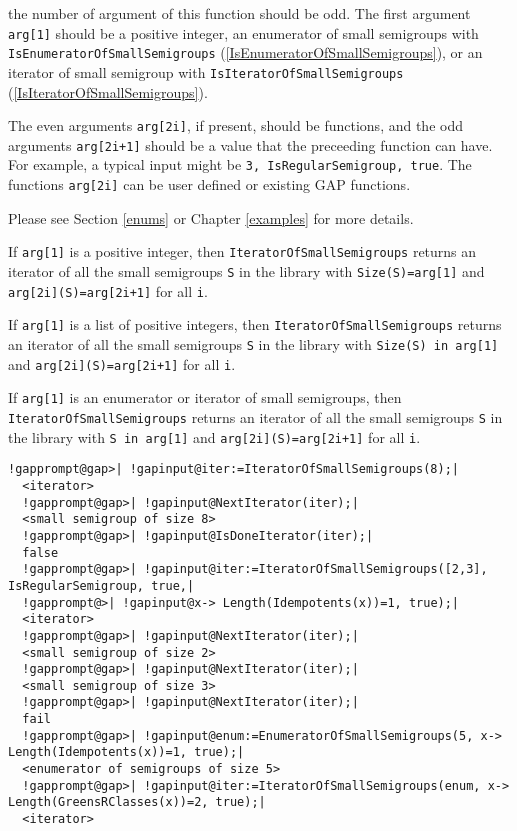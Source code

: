 \documentclass[a4paper,11pt]{report}
\begin{document}
{{{ the number of argument of this function should be odd. The first argument \texttt{arg[1]} should be a positive integer, an enumerator of small semigroups with \texttt{IsEnumeratorOfSmallSemigroups} (\ref{IsEnumeratorOfSmallSemigroups}), or an iterator of small semigroup with \texttt{IsIteratorOfSmallSemigroups} (\ref{IsIteratorOfSmallSemigroups}). 

 The even arguments \texttt{arg[2i]}, if present, should be functions, and the odd arguments \texttt{arg[2i+1]} should be a value that the preceeding function can have. For example, a
typical input might be \texttt{3, IsRegularSemigroup, true}. The functions \texttt{arg[2i]} can be user defined or existing \textsf{GAP} functions.

 Please see Section \ref{enums} or Chapter \ref{examples} for more details. 

 If \texttt{arg[1]} is a positive integer, then \texttt{IteratorOfSmallSemigroups} returns an iterator of all the small semigroups \texttt{S} in the library with \texttt{Size(S)=arg[1]} and \texttt{arg[2i](S)=arg[2i+1]} for all \texttt{i}. 

 If \texttt{arg[1]} is a list of positive integers, then \texttt{IteratorOfSmallSemigroups} returns an iterator of all the small semigroups \texttt{S} in the library with \texttt{Size(S) in arg[1]} and \texttt{arg[2i](S)=arg[2i+1]} for all \texttt{i}. 

 If \texttt{arg[1]} is an enumerator or iterator of small semigroups, then \texttt{IteratorOfSmallSemigroups} returns an iterator of all the small semigroups \texttt{S} in the library with \texttt{S in arg[1]} and \texttt{arg[2i](S)=arg[2i+1]} for all \texttt{i}. 

 
\begin{Verbatim}[commandchars=!@|,fontsize=\small,frame=single,label=Example]
  !gapprompt@gap>| !gapinput@iter:=IteratorOfSmallSemigroups(8);|
  <iterator>
  !gapprompt@gap>| !gapinput@NextIterator(iter);|
  <small semigroup of size 8>
  !gapprompt@gap>| !gapinput@IsDoneIterator(iter);|
  false
  !gapprompt@gap>| !gapinput@iter:=IteratorOfSmallSemigroups([2,3], IsRegularSemigroup, true,|
  !gapprompt@>| !gapinput@x-> Length(Idempotents(x))=1, true);|
  <iterator>
  !gapprompt@gap>| !gapinput@NextIterator(iter);|
  <small semigroup of size 2>
  !gapprompt@gap>| !gapinput@NextIterator(iter);|
  <small semigroup of size 3>
  !gapprompt@gap>| !gapinput@NextIterator(iter);|
  fail
  !gapprompt@gap>| !gapinput@enum:=EnumeratorOfSmallSemigroups(5, x-> Length(Idempotents(x))=1, true);|
  <enumerator of semigroups of size 5>
  !gapprompt@gap>| !gapinput@iter:=IteratorOfSmallSemigroups(enum, x-> Length(GreensRClasses(x))=2, true);|
  <iterator>
\end{Verbatim}
 }

}}
\end{document}
